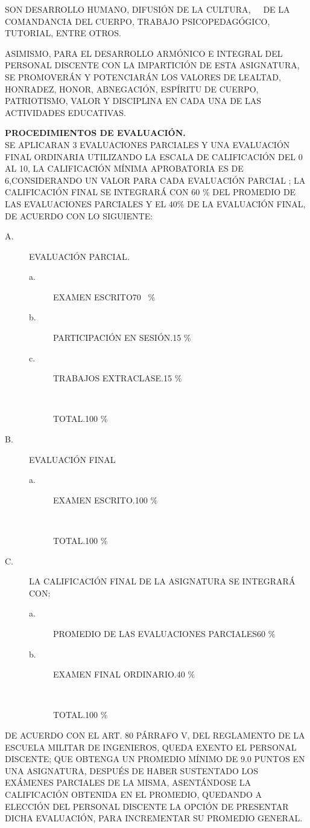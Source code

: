 \documentclass{myarticle}
\def\lineach#1#2{
#1\hfill #2
}
\begin{document}
\begin{description}
\begin{description}
SON DESARROLLO HUMANO, DIFUSIÓN DE LA CULTURA,\ \ \ DE LA COMANDANCIA DEL CUER\-PO, 
TRABAJO PSICOPEDAGÓGICO, TUTORIAL, ENTRE OTROS.
\item[D.]ASIMISMO, PARA EL DESARROLLO ARMÓNICO E INTEGRAL DEL PERSONAL 
DISCENTE CON LA IMPARTICIÓN DE ESTA ASIGNATURA, SE PROMOVERÁN Y POTENCIARÁN 
LOS VALORES DE LEALTAD, HONRADEZ, HONOR, ABNEGACIÓN, ES\-PÍ\-RI\-TU DE CUERPO, 
PATRIOTISMO, VALOR Y DISCIPLINA EN CADA UNA DE LAS ACTIVIDADES EDUCATIVAS.
\end{description}
\item[{\large{\bf IV.}}] {\large{\bf PROCEDIMIENTOS DE EVALUACIÓN.}}\\
SE APLICARAN 3 EVALUACIONES PARCIALES Y UNA E\-VA\-LUA\-CIÓN FINAL ORDINARIA 
UTILIZANDO LA ESCALA DE CALIFICACIÓN DEL 0 AL 10, LA CALIFICACIÓN MÍNIMA 
APROBATORIA ES DE 6,CONSIDERANDO UN VALOR PARA CADA EVALUACIÓN PARCIAL ; 
LA CALIFICACIÓN FINAL SE INTEGRARÁ CON 60 $\%$ DEL PROMEDIO DE LAS 
EVALUACIONES PARCIALES Y EL 40$\%$ DE LA EVALUACIÓN FINAL, DE ACUERDO CON 
LO SIGUIENTE:
\begin{description}
\item[A.]EVALUACIÓN PARCIAL.
\begin{description}
\item[a.]\lineach{EXAMEN ESCRITO}{70 \ \%}
\item[b.]\lineach{PARTICIPACIÓN EN SESIÓN.}{15 $\%$}
\item[c.]\lineach{TRABAJOS EXTRACLASE.}{15 $\%$}
\item[\ \ ]\lineach{TOTAL.}{100 $\%$}
\end{description}
\item[B.]EVALUACIÓN FINAL
\begin{description}
\item[a.]\lineach{EXAMEN ESCRITO.}{100 $\%$}
\item[\ \ ]\lineach{TOTAL.}{100 $\%$}
\end{description}
\item[C.]LA CALIFICACIÓN FINAL DE LA ASIGNATURA SE INTEGRARÁ CON:
\begin{description}
\item[a.]\lineach{PROMEDIO DE LAS EVALUACIONES PARCIALES}{60 $\%$}
\item[b.]\lineach{EXAMEN FINAL ORDINARIO.}{40 $\%$}
\item[\ \ ]\lineach{TOTAL.}{100 $\%$}
\end{description}
\end{description}
DE ACUERDO CON EL ART. 80 PÁRRAFO V, DEL REGLAMENTO DE LA ESCUELA MILITAR 
DE INGENIEROS, QUEDA EXENTO EL PERSONAL DISCENTE; QUE OBTENGA UN PROMEDIO 
MÍNIMO DE 9.0 PUNTOS EN UNA ASIGNATURA, DESPUÉS DE HABER SUSTENTADO LOS 
EXÁMENES PARCIALES DE LA MISMA, A\-SEN\-TÁN\-DO\-SE LA CALIFICACIÓN 
OBTENIDA EN EL PROMEDIO, QUE\-DAN\-DO A ELECCIÓN DEL PERSONAL DISCENTE LA 
OPCIÓN DE PRESENTAR DICHA EVALUACIÓN, PARA INCREMENTAR SU PRO\-ME\-DIO 
GENERAL.


\end{description}
\end{document}
